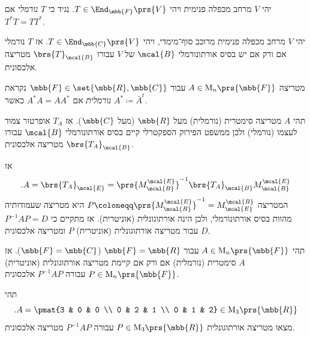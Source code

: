 \documentclass[a4paper,10pt,twoside,openany]{book}
\renewcommand{\Mat}{\mathrm{M}}
\begin{document}
\begin{definition}
יהי
$V$
מרחב מכפלה פנימית ויהי
$T \in \End_{\mbb{F}}\prs{V}$.
נגיד כי
$T$
\emph{נורמלי}
אם
$T^* T = T T^*$.
\end{definition}

\begin{theorem}
יהי
$V$
מרחב מכפלה פנימית מרוכב סוף־מימדי, ויהי
$T \in \End_{\mbb{C}}\prs{V}$.
אז
$T$
נורמלי אם ורק אם יש בסיס אורתונורמלי
$\mcal{B}$
של
$V$
עבורו
$\brs{T}_\mcal{B}$
מטריצה אלכסונית.
\end{theorem}

\begin{definition}
מטריצה
$A \in \Mat_n\prs{\mbb{F}}$
עבור
$\mbb{F} \in \set{\mbb{R}, \mbb{C}}$
נקראת
\emph{נורמלית}
אם
$A^* A = A A^*$
כאשר
$A^* \coloneqq \bar{A}^t$.
\end{definition}

\begin{remark}
תהי
$A$
מטריצה סימטרית (נורמלית) מעל
$\mbb{R}$
(מעל
$\mbb{C}$).
אז
$T_A$
אופרטור צמוד לעצמו (נורמלי) ולכן ממשפט הפירוק הספקטרלי קיים בסיס אורתונורמלי
$\mcal{B}$
עבורו
$\brs{T_A}_\mcal{B}$
מטריצה אלכסונית.

אז
\[\text{.} A = \brs{T_A}_\mcal{E} = \prs{M^\mcal{E}_\mcal{B}}^{-1} \brs{T_A}_\mcal{B} M^\mcal{E}_\mcal{B}\]
המטריצה
$P \coloneqq \prs{M^\mcal{E}_\mcal{B}}^{-1} = M^\mcal{B}_\mcal{E}$
היא מטריצה שעמודותיה מהוות בסיס אורתונורמלי, ולכן הינה אורתוגונלית (אוניטרית). אז מתקיים כי
$P^{-1} A P = D$
עבור מטריצה אורתוגונלית (אוניטרית)
$P$
ומטריצה אלכסונית
$D$.
\end{remark}

\begin{theorem}
תהי
$A \in \Mat_n\prs{\mbb{F}}$
עבור
$\mbb{F} = \mbb{R}$
($\mbb{F} = \mbb{C}$).
אז
$A$
סימטרית (נורמלית) אם ורק אם קיימת מטריצה אורתוגונלית (אוניטרית)
$P \in \Mat_n\prs{\mbb{F}}$
עבורה
$P^{-1} A P$
אלכסונית.
\end{theorem}

\begin{exercisechap}
תהי
\[\text{.} A = \pmat{3 & 0 & 0 \\ 0 & 2 & 1 \\ 0 & 1 & 2} \in \Mat_3\prs{\mbb{R}}\]
מצאו מטריצה אורתוגונלית
$P \in \Mat_3\prs{\mbb{R}}$
עבורה
$P^{-1} A P$
מטריצה אלכסונית.
\end{exercisechap}
\end{document}
